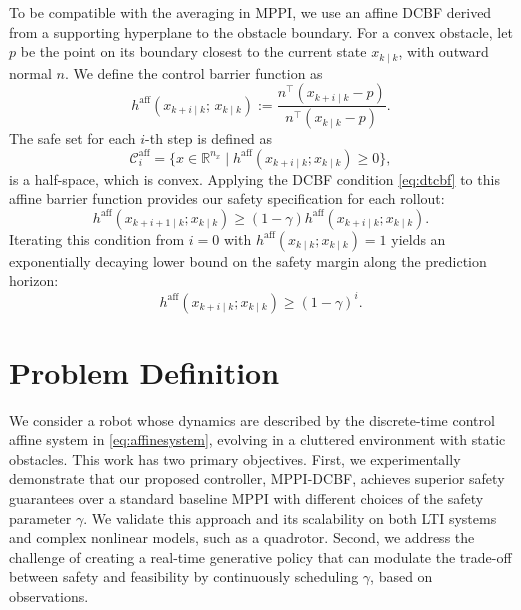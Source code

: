 \documentclass[letterpaper, 10 pt, conference]{ieeeconf}
\newcommand{\note}[2][NOTE]{\vspace{3 mm}\par \noindent \framebox{\color{red} \begin{minipage}[c]{0.97 \hsize} {\bf #1:} #2 \end{minipage}}\vspace{3 mm}\par}
\begin{document}
To be compatible with the averaging in MPPI, we use an affine DCBF derived from a supporting hyperplane to the obstacle boundary. For a convex obstacle, let $p$ be the point on its boundary closest to the current state $x_{k\mid k}$, with outward normal $n$. We define the control barrier function as
\begin{equation}
h^{\mathrm{aff}}(x_{k+i\mid k};\,x_{k\mid k}) :=
\frac{n^\top(x_{k+i\mid k}-p)}{n^\top(x_{k\mid k}-p)}.
\label{eq:aff_barrier}
\end{equation}
The safe set for each $i$-th step is defined as
\begin{equation}
\mathcal{C}_i^{\mathrm{aff}}=\{x \in \mathbb{R}^{n_x} \mid h^{\mathrm{aff}}(x_{k+i\mid k}; x_{k\mid k})\ge 0\},\label{eq:aff_safeset}
\end{equation}
is a half-space, which is convex. Applying the DCBF condition \eqref{eq:dtcbf} to this affine barrier function provides our safety specification for each rollout:
\begin{equation}
h^{\mathrm{aff}}(x_{k+i+1\mid k};x_{k\mid k}) \ge (1-\gamma) h^{\mathrm{aff}}(x_{k+i\mid k};x_{k\mid k}).
\end{equation}
Iterating this condition from $i=0$ with $h^{\mathrm{aff}}(x_{k\mid k};x_{k\mid k})=1$ yields an exponentially decaying lower bound on the safety margin along the prediction horizon:
\begin{equation}
h^{\mathrm{aff}}(x_{k+i\mid k};x_{k\mid k}) \ge (1-\gamma)^i.
\label{eq:safetyspecification}
\end{equation}

\section{Problem Definition}
We consider a robot whose dynamics are described by the discrete-time control affine system in \eqref{eq:affinesystem}, evolving in a cluttered environment with static obstacles. This work has two primary objectives. First, we experimentally demonstrate that our proposed controller, MPPI-DCBF, achieves superior safety guarantees over a standard baseline MPPI with different choices of the safety parameter $\gamma$. We validate this approach and its scalability on both LTI systems and complex nonlinear models, such as a quadrotor. Second, we address the challenge of creating a real-time generative policy that can modulate the trade-off between safety and feasibility by continuously scheduling $\gamma$, based on observations.
\end{document}
